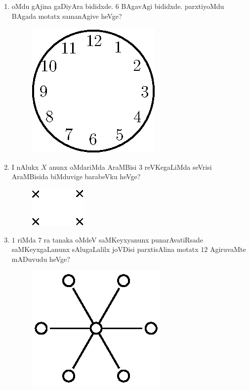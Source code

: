 \begin{enumerate}
\item oMdu gAjina gaDiyAra bididxde. $6$ BAgavAgi bididxde. parxtiyoMdu BAgada motatx samanAgive heVge?
\begin{figure}[H]
\centering
\includegraphics{src/figures/exr31.eps}
\end{figure}

\item I nAlukx $X$ anunx oMdariMda AraMBisi $3$ reVKegaLiMda seVrisi AraMBisida biMduvige barabeVku heVge?
\begin{figure}[H]
\centering
\includegraphics{src/figures/exr32.eps}
\end{figure}

\eject

\item $1$ riMda $7$ ra tanaka oMdeV saMKeyxyanunx punarAvatiRsade saMKeyxgaLanunx sAlugaLalilx joVDisi parxtisAlina motatx $12$ AgiruvaMte mADuvudu heVge?
\begin{figure}[H]
\centering
\includegraphics{src/figures/exr33.eps}
\end{figure}


\end{enumerate}
